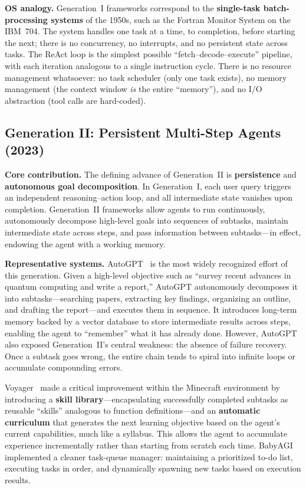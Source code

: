 \documentclass[11pt,a4paper]{article}
\begin{document}
\textbf{OS analogy.}
Generation~I frameworks correspond to the \textbf{single-task batch-processing systems} of the 1950s, such as the Fortran Monitor System on the IBM~704.
The system handles one task at a time, to completion, before starting the next; there is no concurrency, no interrupts, and no persistent state across tasks.
The ReAct loop is the simplest possible ``fetch--decode--execute'' pipeline, with each iteration analogous to a single instruction cycle.
There is no resource management whatsoever: no task scheduler (only one task exists), no memory management (the context window \textit{is} the entire ``memory''), and no I/O abstraction (tool calls are hard-coded).

\subsection{Generation II: Persistent Multi-Step Agents (2023)}

\textbf{Core contribution.}
The defining advance of Generation~II is \textbf{persistence} and \textbf{autonomous goal decomposition}.
In Generation~I, each user query triggers an independent reasoning--action loop, and all intermediate state vanishes upon completion.
Generation~II frameworks allow agents to run continuously, autonomously decompose high-level goals into sequences of subtasks, maintain intermediate state across steps, and pass information between subtasks---in effect, endowing the agent with a working memory.

\textbf{Representative systems.}
AutoGPT~\cite{autogpt_repo_2026} is the most widely recognized effort of this generation.
Given a high-level objective such as ``survey recent advances in quantum computing and write a report,'' AutoGPT autonomously decomposes it into subtasks---searching papers, extracting key findings, organizing an outline, and drafting the report---and executes them in sequence.
It introduces long-term memory backed by a vector database to store intermediate results across steps, enabling the agent to ``remember'' what it has already done.
However, AutoGPT also exposed Generation~II's central weakness: the absence of failure recovery.
Once a subtask goes wrong, the entire chain tends to spiral into infinite loops or accumulate compounding errors.

Voyager~\cite{wang2023voyager} made a critical improvement within the Minecraft environment by introducing a \textbf{skill library}---encapsulating successfully completed subtasks as reusable ``skills'' analogous to function definitions---and an \textbf{automatic curriculum} that generates the next learning objective based on the agent's current capabilities, much like a syllabus.
This allows the agent to accumulate experience incrementally rather than starting from scratch each time.
BabyAGI implemented a cleaner task-queue manager: maintaining a prioritized to-do list, executing tasks in order, and dynamically spawning new tasks based on execution results.
\end{document}
